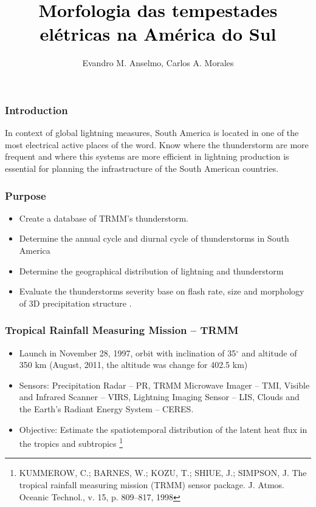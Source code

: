\documentclass[smaller]{beamer}
\title[DCA--IAG--USP]{\textcolor{black}{Morfologia das tempestades el\'{e}tricas na América do Sul}}
\subtitle{}
\date[]{\begin{footnotesize}IAG/USP -- 2015\end{footnotesize}}
\author[IAG]{Evandro M. Anselmo, Carlos A. Morales}
\institute{Institute of Astronomy, Geophysics and Atmospheric Science of University of São Paulo (IAG-USP), São Paulo-SP, Brazil. \par}
\begin{document}
\begin{frame}
\titlepage
\end{frame}
 
 
\begin{frame}
\frametitle{Introduction}
In context of global lightning measures, South America is located in one of the most electrical active places of the word. Know where the thunderstorm are more frequent and where this systems are more efficient in lightning production is essential for planning the infrastructure of the South American countries.
\end{frame}

\begin{frame}
\frametitle{Purpose}
\begin{itemize}
\item Create a database of TRMM's thunderstorm.
\item Determine the annual cycle and diurnal cycle of thunderstorms in South America
\item Determine the geographical distribution of lightning and thunderstorm
\item Evaluate the thunderstorms severity base on flash rate, size and morphology of 3D precipitation structure .
\end{itemize}
\end{frame}

\begin{frame}
\frametitle{Tropical Rainfall Measuring Mission -- TRMM}
\begin{itemize}
\item Launch in November 28, 1997, orbit with inclination of 35$^{\circ}$ and altitude of 350 km (August, 2011, the altitude was change for 402.5 km)
\item Sensors: Precipitation Radar
-- PR, TRMM Microwave Imager -- TMI, Visible and Infrared Scanner -- VIRS, Lightning Imaging Sensor -- LIS,  Clouds and the Earth’s Radiant Energy System
-- CERES.
\item Objective: Estimate the spatiotemporal distribution of the latent heat flux in the tropics and subtropics \footnote{KUMMEROW, C.; BARNES, W.; KOZU, T.; SHIUE, J.; SIMPSON, J. The tropical
rainfall measuring mission (TRMM) sensor package. J. Atmos. Oceanic Technol., v. 15, p. 809--817, 1998}
\end{itemize}

\end{frame} 
\end{document}
